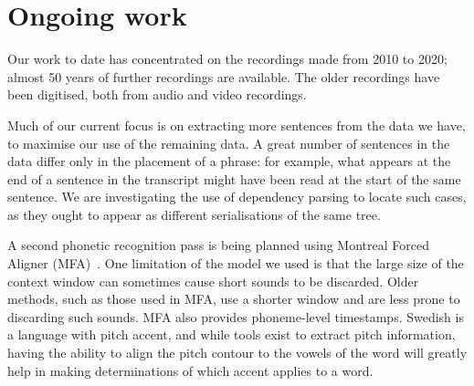 \documentclass{Interspeech}
\begin{document}
\section{Ongoing work}

Our work to date has concentrated on the recordings made from 2010 to 2020; almost 50 years of further recordings are available. The older recordings have been digitised, both from audio and video recordings.

Much of our current focus is on extracting more sentences from the data we have, to maximise our use of the remaining data. A great number of sentences in the data differ only in the placement of a phrase: for example, what appears at the end of a sentence in the transcript might have been read at the start of the same sentence. We are investigating the use of dependency parsing to locate such cases, as they ought to appear as different serialisations of the same tree.

A second phonetic recognition pass is being planned using Montreal Forced Aligner (MFA)~\cite{mcauliffe17_interspeech}. One limitation of the model we used is that the large size of the context window can sometimes cause short sounds to be discarded. Older methods, such as those used in MFA, use a shorter window and are less prone to discarding such sounds.
MFA also provides phoneme-level timestamps. Swedish is a language with pitch accent, and while tools exist to extract pitch information, having the ability to align the pitch contour to the vowels of the word will greatly help in making determinations of which accent applies to a word.






\end{document}
